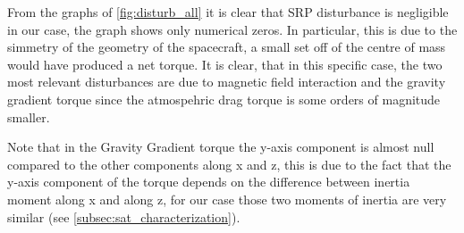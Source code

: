 From the graphs of \autoref{fig:disturb_all} it is clear that SRP disturbance is negligible
in our case, the graph shows only numerical zeros. In particular, this is due to the simmetry of 
the geometry of the spacecraft, a small set off of the centre of mass would have produced a net torque. 
It is clear, that in this specific case, the two most relevant disturbances are due to magnetic field
interaction and the gravity gradient torque since the atmospehric drag torque is some orders of magnitude 
smaller.

Note that in the Gravity Gradient torque the y-axis component is almost null compared to the other 
components along x and z, this is due to the fact that the y-axis component of the torque depends on 
the difference between inertia moment along x and along z, for our case those two moments of inertia are 
very similar (see \autoref{subsec:sat_characterization}). 